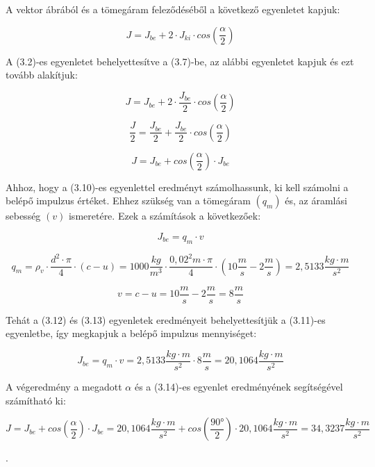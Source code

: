 \noindent A vektor ábrából és a tömegáram feleződéséből a következő egyenletet kapjuk:

\begin{equation}
J=J_{be}+2\cdot{J_{ki}\cdot{cos\left(\frac{\alpha}{2}\right)}}
\end{equation}

\noindent A (3.2)-es egyenletet behelyettesítve a (3.7)-be, az alábbi egyenletet kapjuk és ezt tovább alakítjuk:

\begin{equation}
J=J_{be}+2\cdot\frac{J_{be}}{2}\cdot{cos\left(\frac{\alpha}{2}\right)}
\end{equation}

\begin{equation}
\frac{J}{2}=\frac{J_{be}}{2}+\frac{J_{be}}{2}\cdot{cos\left(\frac{\alpha}{2}\right)}
\end{equation}

\begin{equation}
J=J_{be}+{cos\left(\frac{\alpha}{2}\right)}\cdot{J_{be}}
\end{equation}

\noindent Ahhoz, hogy a (3.10)-es egyenlettel eredményt számolhassunk, ki kell számolni a belépő impulzus értéket. Ehhez szükség van a tömegáram $(q_m)$ és, az áramlási sebesség $(v)$ ismeretére. Ezek a számítások a következőek:

\begin{equation}
J_{be}=q_m\cdot{v}
\end{equation}

\begin{equation}
q_m=\rho_v\cdot{\frac{d^2\cdot{\pi}}{4}}\cdot(c-u)=1000\frac{kg}{m^3}\cdot{\frac{0,02^2{m}\cdot{\pi}}{4}}\cdot(10\frac{m}{s}-2\frac{m}{s})=2,5133  {\frac{kg\cdot{m}}{s^2}}
\end{equation}

\begin{equation}
v=c-u=10\frac{m}{s}-2\frac{m}{s}=8\frac{m}{s}
\end{equation}

\noindent Tehát a (3.12) és (3.13) egyenletek eredményeit behelyettesítjük a (3.11)-es egyenletbe, így megkapjuk a belépő impulzus mennyiséget:

\begin{equation}
J_{be}=q_m\cdot{v}=2,5133\frac{kg\cdot{m}}{s^2}\cdot{8}\frac{m}{s}=20,1064\frac{kg\cdot{m}}{s^2}
\end{equation}

\noindent A végeredmény a megadott $\alpha$ és a (3.14)-es egyenlet eredményének segítségével számítható ki:

\begin{equation}
J=J_{be}+{cos\left(\frac{\alpha}{2}\right)}\cdot{J_{be}}=20,1064\frac{kg\cdot{m}}{s^2}+{cos\left(\frac{90°}{2}\right)}\cdot{20,1064\frac{kg\cdot{m}}{s^2}}=34,3237 \frac{kg\cdot{m}}{s^2}
\end{equation}


\noindent{}.

\pagebreak
